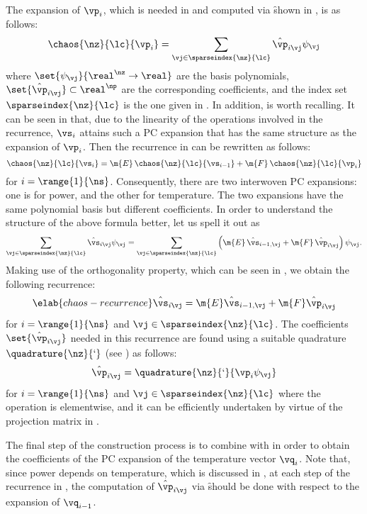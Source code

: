 The expansion of $\vp_i$, which is needed in 
and computed via \f shown in , is as follows:
\[
  \chaos{\nz}{\lc}{\vp_i} = \sum_{\vj \in \sparseindex{\nz}{\lc}} \hat{\vp}_{i \vj} \psi_{\vj}
\]
where $\set{\psi_{\vj}}{\real^\nz \to \real}$ are the basis polynomials,
$\set{\hat{\vp}_{i \vj}} \subset \real^\np$ are the corresponding coefficients,
and the index set $\sparseindex{\nz}{\lc}$ is the one given in
. In addition,
 is worth recalling. It can be seen in
 that, due to the linearity of the operations
involved in the recurrence, $\vs_i$ attains such a \ac{PC} expansion that has
the same structure as the expansion of $\vp_i$. Then the recurrence in
 can be rewritten as follows:
\[
  \chaos{\nz}{\lc}{\vs_i} = \m{E} \, \chaos{\nz}{\lc}{\vs_{i - 1}} + \m{F} \, \chaos{\nz}{\lc}{\vp_i}
\]
for $i = \range{1}{\ns}$. Consequently, there are two interwoven \ac{PC}
expansions: one is for power, and the other for temperature. The two expansions
have the same polynomial basis but different coefficients. In order to
understand the structure of the above formula better, let us spell it out as
\[
  \sum_{\vj \in \sparseindex{\nz}{\lc}} \hat{\vs}_{i \vj} \psi_{\vj} =
  \sum_{\vj \in \sparseindex{\nz}{\lc}} \left(\m{E} \, \hat{\vs}_{i - 1, \vj} + \m{F} \, \hat{\vp}_{i \vj}\right) \psi_{\vj}.
\]
Making use of the orthogonality property, which can be seen in
, we obtain the following recurrence:
\begin{equation} \elab{chaos-recurrence}
  \hat{\vs}_{i \vj} = \m{E} \hat{\vs}_{i - 1, \vj} + \m{F} \hat{\vp}_{i \vj}
\end{equation}
for $i = \range{1}{\ns}$ and $\vj \in \sparseindex{\nz}{\lc}$. The coefficients
$\set{\hat{\vp}_{i \vj}}$ needed in this recurrence are found using a suitable
quadrature $\quadrature{\nz}{\lq}$ (see ) as follows:
\[
  \hat{\vp}_{i \vj} = \quadrature{\nz}{\lq}{\vp_i \psi_{\vj}}
\]
for $i = \range{1}{\ns}$ and $\vj \in \sparseindex{\nz}{\lc}$ where the
operation is elementwise, and it can be efficiently undertaken by virtue of the
projection matrix in .

The final step of the construction process is to combine 
with  in order to obtain the coefficients of the
\ac{PC} expansion of the temperature vector $\vq_i$. Note that, since power
depends on temperature, which is discussed in , at each step
of the recurrence in , the computation of $\hat{\vp}_{i
\vj}$ via \f should be done with respect to the expansion of $\vq_{i - 1}$.

